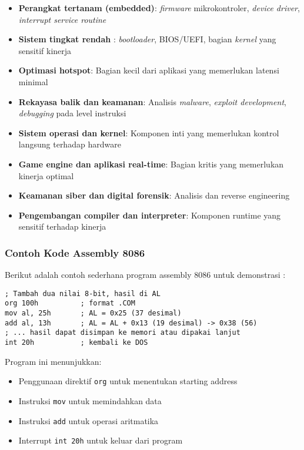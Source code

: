 \begin{itemize}
    \item \textbf{Perangkat tertanam (embedded)}: \textit{firmware} mikrokontroler, \textit{device driver}, \textit{interrupt service routine}
    \item \textbf{Sistem tingkat rendah }: \textit{bootloader}, BIOS/UEFI, bagian \textit{kernel} yang sensitif kinerja
    \item \textbf{Optimasi hotspot}: Bagian kecil dari aplikasi yang memerlukan latensi minimal
    \item \textbf{Rekayasa balik dan keamanan}: Analisis \textit{malware}, \textit{exploit development}, \textit{debugging} pada level instruksi
    \item \textbf{Sistem operasi dan kernel}: Komponen inti yang memerlukan kontrol langsung terhadap hardware
    \item \textbf{Game engine dan aplikasi real-time}: Bagian kritis yang memerlukan kinerja optimal
    \item \textbf{Keamanan siber dan digital forensik}: Analisis dan reverse engineering
    \item \textbf{Pengembangan compiler dan interpreter}: Komponen runtime yang sensitif terhadap kinerja
\end{itemize}

\subsubsection{Contoh Kode Assembly 8086}
Berikut adalah contoh sederhana program assembly 8086 untuk demonstrasi \cite{susanto1995belajar}:

\begin{lstlisting}[language={[x86masm]Assembler}, caption={Cuplikan 8086 (ilustratif)}, label={lst:assembly_example}]
; Tambah dua nilai 8-bit, hasil di AL
org 100h          ; format .COM
mov al, 25h       ; AL = 0x25 (37 desimal)
add al, 13h       ; AL = AL + 0x13 (19 desimal) -> 0x38 (56)
; ... hasil dapat disimpan ke memori atau dipakai lanjut
int 20h           ; kembali ke DOS
\end{lstlisting}

Program ini menunjukkan:
\begin{itemize}
    \item Penggunaan direktif \texttt{org} untuk menentukan starting address
    \item Instruksi \texttt{mov} untuk memindahkan data
    \item Instruksi \texttt{add} untuk operasi aritmatika
    \item Interrupt \texttt{int 20h} untuk keluar dari program
\end{itemize}

